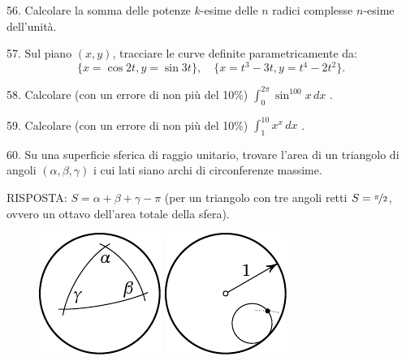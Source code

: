\begin{problem}{56.}
	Calcolare la somma delle potenze $k$-esime delle $n$ radici complesse $n$-esime dell'unità.
\end{problem}

\begin{problem}{57.}
Sul piano $(x,y)$, tracciare le curve definite parametricamente da:
	\begin{equation*}
		\{x=\cos 2t, y=\sin 3t\},\quad
		\{x=t^3-3t, y=t^4-2t^2\}.
	\end{equation*}
	\vspace{-2\baselineskip}%
\end{problem}

\begin{problem}{58.}
	Calcolare (con un errore di non più del 10\%)
 $\int_0^{2\pi} \sin^{100} x\,dx$ .
\end{problem}

\begin{problem}{59.}
	Calcolare (con un errore di non più del 10\%)  $\int_1^{10} x^x\,dx$ .
\end{problem}

\begin{problem}{60.}
	Su una superficie sferica di raggio unitario, trovare l’area di un triangolo di angoli $(\alpha, \beta, \gamma)$ i cui lati siano archi di circonferenze massime.

	\begin{note}{RISPOSTA:}
		$S=\alpha+\beta+\gamma-\pi$ (per un triangolo con tre angoli retti  $S=\nicefrac{\pi}{2}$, ovvero un ottavo dell’area totale della sfera).
		\begin{figure}
			\null\hfill
			\includegraphics{resources/taskbook-44}
			\hfill
			\includegraphics{resources/taskbook-45}
			\hfill\null
		\end{figure}
	\end{note}
\end{problem}

